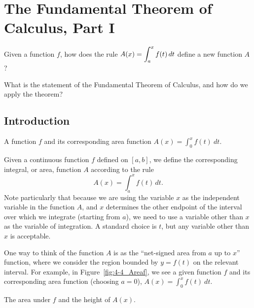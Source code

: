 \section{The Fundamental Theorem of Calculus, Part I} \label{S:4.4.FTCI}

\begin{goals}
\item Given a function $f$, how does the rule $\displaystyle A(x) = \int_a^x f(t) \, dt$ define a new function $A$?
\item What is the statement of the Fundamental Theorem of Calculus, and how do we apply the theorem?
\end{goals}

\subsection*{Introduction}

\begin{marginfigure}[2.5in] %
\caption{A function $f$ and its corresponding area function $A(x) = \int_0^x f(t) \ dt$.} \label{fig:4-4_Areaf}
\end{marginfigure}

Given a continuous function $f$ defined on $[a,b]$, we define the corresponding integral, or area, function $A$ according to the rule 
\begin{equation} \label{E:intfxn}
A(x) = \int_a^x f(t) \, dt.
\end{equation}
Note particularly that because we are using the variable $x$ as the independent variable in the function $A$, and $x$ determines the other endpoint of the interval over which we integrate (starting from $a$), we need to use a variable other than $x$ as the variable of integration.  A standard choice is $t$, but any variable other than $x$ is acceptable.

One way to think of the function $A$ is as the ``net-signed area from $a$ up to $x$'' function, where we consider the region bounded by $y = f(t)$ on the relevant interval.  For example, in Figure~\ref{fig:4-4_Areaf}, we see a given function $f$ and its corresponding area function (choosing $a = 0$), $A(x) = \int_0^x f(t) \ dt$.

\begin{marginfigure} %
\captionsetup[subfigure]{labelformat=empty}

\caption{The area under $f$ and the height of $A(x)$.} \label{fig:4-4_Areaf2a}
\end{marginfigure}

